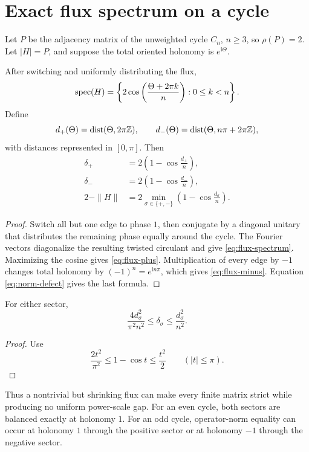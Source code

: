 \section{Exact flux spectrum on a cycle}
\label{sec:flux}

Let \(P\) be the adjacency matrix of the unweighted cycle \(C_n\),
\(n\ge3\), so \(\rho(P)=2\).  Let \(|H|=P\), and suppose the total
oriented holonomy is \(e^{\mathrm i\Theta}\).

\begin{theorem}\label{thm:flux}
After switching and uniformly distributing the flux,
\begin{equation}\label{eq:flux-spectrum}
 \operatorname{spec}(H)
 =
 \left\{
 2\cos\left(\frac{\Theta+2\pi k}{n}\right):
 0\le k<n
 \right\}.
\end{equation}
Define
\[
 d_+(\Theta)=\operatorname{dist}(\Theta,2\pi\mathbb Z),
 \qquad
 d_-(\Theta)=\operatorname{dist}(\Theta,n\pi+2\pi\mathbb Z),
\]
with distances represented in \([0,\pi]\).  Then
\begin{align}
 \delta_+
 &=
 2\left(1-\cos\frac{d_+}{n}\right),
 \label{eq:flux-plus}\\
 \delta_-
 &=
 2\left(1-\cos\frac{d_-}{n}\right),
 \label{eq:flux-minus}\\
 2-\|H\|
 &=
 2\min_{\sigma\in\{+,-\}}
 \left(1-\cos\frac{d_\sigma}{n}\right).
 \label{eq:flux-norm}
\end{align}
\end{theorem}

\begin{proof}
Switch all but one edge to phase \(1\), then conjugate by a diagonal
unitary that distributes the remaining phase equally around the cycle.
The Fourier vectors diagonalize the resulting twisted circulant and
give \eqref{eq:flux-spectrum}.  Maximizing the cosine gives
\eqref{eq:flux-plus}.  Multiplication of every edge by \(-1\) changes
total holonomy by \((-1)^n=e^{\mathrm i n\pi}\), which gives
\eqref{eq:flux-minus}.  Equation \eqref{eq:norm-defect} gives the last
formula.
\end{proof}

\begin{corollary}\label{cor:quadratic}
For either sector,
\begin{equation}\label{eq:quadratic}
 \frac{4d_\sigma^2}{\pi^2n^2}
 \le\delta_\sigma
 \le\frac{d_\sigma^2}{n^2}.
\end{equation}
\end{corollary}

\begin{proof}
Use
\[
 \frac{2t^2}{\pi^2}\le1-\cos t\le\frac{t^2}{2}
 \qquad(|t|\le\pi).
\]
\end{proof}

Thus a nontrivial but shrinking flux can make every finite matrix
strict while producing no uniform power-scale gap.  For an even cycle,
both sectors are balanced exactly at holonomy \(1\).  For an odd cycle,
operator-norm equality can occur at holonomy \(1\) through the positive
sector or at holonomy \(-1\) through the negative sector.
